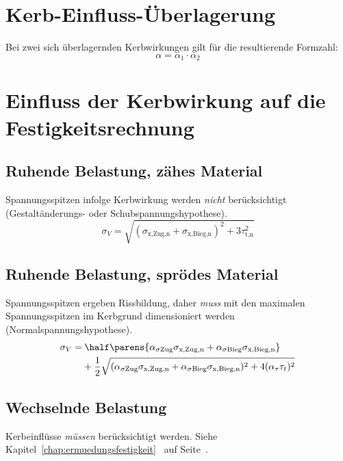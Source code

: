 \section{Kerb-Einfluss-Überlagerung} %
	Bei zwei sich überlagernden Kerbwirkungen gilt für die resultierende Formzahl:
	\begin{equation*}
		\alpha = \alpha_1 \cdot \alpha_2
	\end{equation*}
\section{Einfluss der Kerbwirkung auf die Festigkeitsrechnung} %
	\subsection{Ruhende Belastung, zähes Material} %
		Spannungsspitzen infolge Kerbwirkung werden \emph{nicht} be\-rück\-sich\-tigt (Gestaltänderungs- oder Schubspannungshypothese).
		\begin{equation*}
			\sigma_V = \sqrt{(\sigma_{\text{x,Zug,n}} + \sigma_{\text{x,Bieg,n}})^2 + 3 \tau_{\text{t,n}}^2}
		\end{equation*}
	\subsection{Ruhende Belastung, sprödes Material} %
		Spannungsspitzen ergeben Rissbildung, daher \emph{muss} mit den maximalen Spannungsspitzen im Kerbgrund dimensioniert werden (Normalspannungshypothese).
		\begin{align*}
			\sigma_V =&\: \half  \parens{\alpha_{\sigma\text{Zug}}\sigma_{\text{x,Zug,n}} + \alpha_{\sigma\text{Bieg}}\sigma_{\text{x,Bieg,n}}} \\
			&+ \frac{1}{2}\sqrt{(\alpha_{\sigma\text{Zug}}\sigma_{\text{x,Zug,n}} + \alpha_{\sigma\text{Bieg}}\sigma_{\text{x,Bieg,n}})^2+4(\alpha_{\tau}\tau_t)^2}
		\end{align*}
	\subsection{Wechselnde Belastung} %
		Kerbeinflüsse \emph{müssen} berücksichtigt werden. Siehe Kapitel~\ref{chap:ermuedungsfestigkeit}~ auf Seite~\pageref{chap:ermuedungsfestigkeit}.
